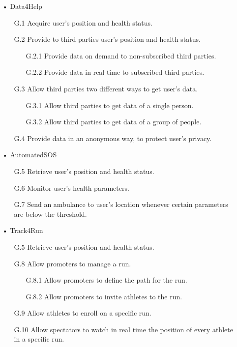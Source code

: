 \begin{enumerate}
\item[•] {\Large Data4Help}
	\begin{enumerate}
		\item [G.1] Acquire user's position and health status.
		\item [G.2] Provide to third parties user's position and health status.
		\begin{enumerate}
		\item [G.2.1] Provide data on demand to non-subscribed third parties.
		\item [G.2.2] Provide data in real-time to subscribed third parties.
		\end{enumerate}
		\item [G.3] Allow third parties two different ways to get user's data.
		\begin{enumerate}
		\item [G.3.1] Allow third parties to get data of a single person.
		\item [G.3.2] Allow third parties to get data of a group of people.
		\end{enumerate}
		\item [G.4] Provide data in an anonymous way, to protect user's privacy.
	\end{enumerate}
	
\item[•] {\Large AutomatedSOS}
	\begin{enumerate}
		\item [G.5] Retrieve user's position and health status.
		\item [G.6] Monitor user's health parameters.
		\item [G.7] Send an ambulance to user's location whenever certain parameters are below the threshold.
		\end{enumerate}
	
\item[•] {\Large Track4Run}	
	\begin{enumerate}
		\item [G.5] Retrieve user's position and health status.
		\item [G.8] Allow promoters to manage a run.
		\begin{enumerate}
		\item [G.8.1] Allow promoters to define the path for the run. 
		\item [G.8.2] Allow promoters to invite athletes to the run. 
		\end{enumerate}
		\item [G.9] Allow athletes to enroll on a specific run.
		\item [G.10] Allow spectators to watch in real time the position of every athlete in a specific run.
	\end{enumerate}
\end{enumerate}

